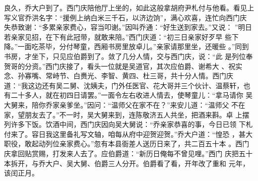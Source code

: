 良久，乔大户到了。西门庆陪他厅上坐的，如此这般拿胡府尹札付与他看。看见上
写义官乔洪名字：“援例上纳白米三千石，以济边饷”，满心欢喜，连忙向西门庆
失恭致谢：“多累亲家费心，容当叩谢。”因叫乔通：“好生送到家去。”又说：
”明日若亲家见招，在下有此冠带，就敢来陪。”西门庆道：“初三日亲家好歹早
些下降。”一面吃茶毕，分付琴童，西厢书房里放卓儿。”亲家请那里坐，还暖些
。”同到书房，才坐下，只见应伯爵到了。敛了几分人情，交与西门庆，说：“此
是列位奉贺哥的分资。”西门庆接了，看头一位就是吴道官，其次应伯爵、谢希大
、祝实念、孙寡嘴、常峙节、白赉光、李智、黄四、杜三哥，共十分人情。西门庆
道：“我这边还有吴二舅、沈姨夫，门外任医官、花大哥并三个伙计、温蔡轩，也
有二十多人，就在初四日请罢。”一面令左右收进人情去，使琴童儿：“拿马请你
吴大舅来，陪你乔家亲爹坐。”因问：“温师父在家不在？”来安儿道：“温师父
不在家，望朋友去了。”不一时，吴大舅来到，连陈敬济五人共坐，把酒来斟。卓
上摆列许多下饭。饮酒中间，西门庆因向吴大舅说：“乔亲家恭喜的事，今日已领
下札付来了。容日我这里备礼写文轴，咱每从府中迎贺迎贺。”乔大户道：“惶恐
，甚大职役，敢起动列位亲家费心。”忽有本县衙差人送历日来了，共二百五十本
。西门庆拿回贴赏赐，打发来人去了。应伯爵道：“新历日俺每不曾见哩。”西门
庆把五十本拆开，与乔大户、吴大舅、伯爵三人分开。伯爵看了看，开年改了重和
元年，该闰正月。

